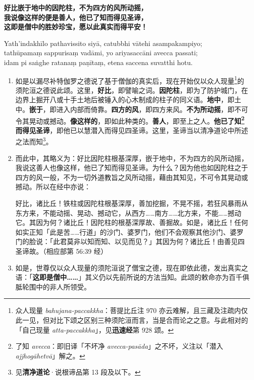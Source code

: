 \textbf{好比嵌于地中的因陀柱，不为四方的风所动摇，\\}
\textbf{我说像这样的便是善人，他已了知而得见圣谛，\\}
\textbf{这即是僧中的胜妙珍宝，愿以此真实而得平安！}

Yath’indakhīlo pathavissito siyā, catubbhi vātehi asampakampiyo;\\
tathūpamaṃ sappurisaṃ vadāmi, yo ariyasaccāni avecca passati;\\
idam pi saṅghe ratanaṃ paṇītaṃ, etena saccena suvatthi hotu. %

\begin{enumerate}\item 如是以漏尽补特伽罗之德说了基于僧伽的真实后，现在开始仅以众人现量\footnote{众人现量 \textit{bahujana-paccakkha}：菩提比丘注 970 亦云难解，且三藏及注疏内仅此一见，但对比下颂之区别三种须陀洹而言，当是合而论之之意。与此相对的「自己现量 \textit{atta-paccakkha}」，见\textbf{迅速经}第 928 颂。}的须陀洹之德说此颂。这里，\textbf{好比}，即譬喻之词。\textbf{因陀柱}，即为了防护城门，在边界上掘开八或十手土地后被锤入的心木制成的柱子的同义语。\textbf{地中}，即土中。\textbf{嵌于}，即进入内部而倚靠。\textbf{四方的风}，即四方来风。\textbf{不为所动摇}，即不可令其晃动或撼动。\textbf{像这样的}，即如此种类的。\textbf{善人}，即至上之人。\textbf{他已了知\footnote{了知 \textit{avecca}：即旧译「不坏净 \textit{avecca-pasāda}」之不坏，义注以「潜入 \textit{ajjhogāhetvā}」解之。}而得见圣谛}，即他已以慧潜入而得见四圣谛。这里，圣谛当以清净道论中所述之法而知\footnote{见\textbf{清净道论}·说根谛品第 13 段及以下。}。
\item 而此中，其略义为：好比因陀柱根基深厚，嵌于地中，不为四方的风所动摇，我说这善人也像这样，他已了知而得见圣谛。为什么？因为他也如因陀柱之于四方的风一般，不为一切外道教旨之风所动摇，藉由其知见，不可令其晃动或撼动。所以在经中亦说：\begin{quoting}好比，诸比丘！铁柱或因陀柱根基深厚，善加挖掘，不晃不摇，若狂风暴雨从东方来，不能动摇、晃动、撼动它，从西方……南方……北方来，不能……撼动它。其因为何？诸比丘！因陀柱的根基深厚故、善掘故。如是，诸比丘！任何如实正知「此是苦……行道」的沙门、婆罗门，他们不会观察其他沙门、婆罗门的脸说：「此君莫非以知而知、以见而见？」其因为何？诸比丘！由善见四圣谛故。（相应部第 56:39 经）\end{quoting}
\item 如是，世尊仅以众人现量的须陀洹说了僧宝之德，现在即依此德，发出真实之语：「\textbf{这即是僧中……}」其义仍以先前所说的方法当知。此颂的敕命亦为百千俱胝轮围中的非人所领受。\end{enumerate}

